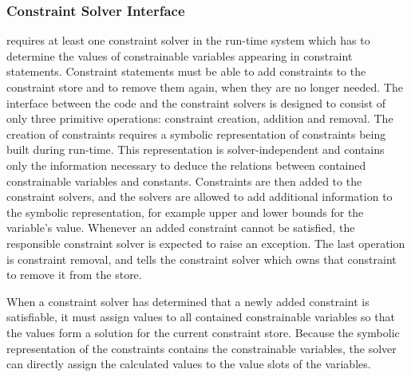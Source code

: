 \subsubsection{Constraint Solver Interface}

\turtle{} requires at least one constraint solver in the run-time
system which has to determine the values of constrainable variables
appearing in constraint statements.  Constraint statements must be
able to add constraints to the constraint store and to remove them
again, when they are no longer needed.  The interface between the
\turtle{} code and the constraint solvers is designed to consist of
only three primitive operations: constraint creation, addition and
removal.  The creation of constraints requires a symbolic
representation of constraints being built during run-time.  This
representation is solver-independent and contains only the information
necessary to deduce the relations between contained constrainable
variables and constants.  Constraints are then added to the constraint
solvers, and the solvers are allowed to add additional information to
the symbolic representation, for example upper and lower bounds for
the variable's value.  Whenever an added constraint cannot be
satisfied, the responsible constraint solver is expected to raise an
exception.  The last operation is constraint removal, and tells the
constraint solver which owns that constraint to remove it from the
store.

When a constraint solver has determined that a newly added constraint
is satisfiable, it must assign values to all contained constrainable
variables so that the values form a solution for the current
constraint store.  Because the symbolic representation of the
constraints contains the constrainable variables, the solver can
directly assign the calculated values to the value slots of the
variables.




